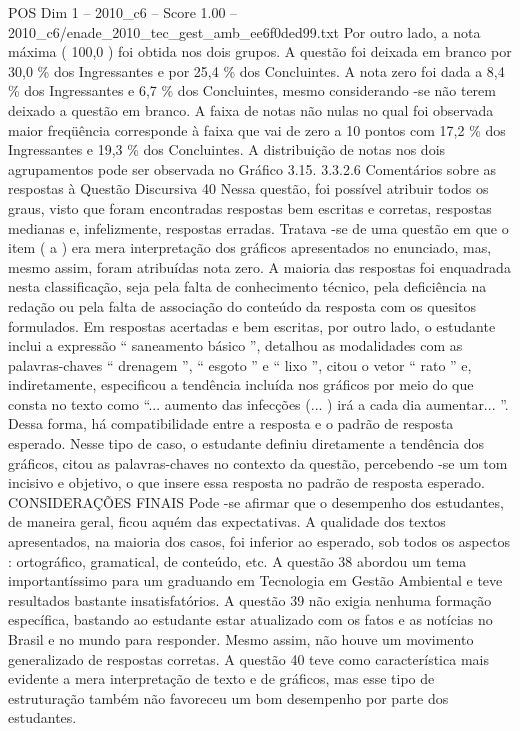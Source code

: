 \begin{textsample}{POS Dim 1 – 2010\_c6 – Score 1.00 – 2010\_c6/enade\_2010\_tec\_gest\_amb\_ee6f0ded99.txt}
Por outro lado, a nota máxima ( 100,0 ) foi obtida nos dois grupos.
A questão foi deixada em branco por 30,0 \% dos Ingressantes e por 25,4 \% dos Concluintes.
A nota zero foi dada a 8,4 \% dos Ingressantes e 6,7 \% dos Concluintes, mesmo considerando -se não terem deixado a questão em branco.
A faixa de notas não nulas no qual foi observada maior freqüência corresponde à faixa que vai de zero a 10 pontos com 17,2 \% dos Ingressantes e 19,3 \% dos Concluintes.
A distribuição de notas nos dois agrupamentos pode ser observada no Gráfico 3.15. 3.3.2.6 Comentários sobre as respostas à Questão Discursiva 40 Nessa questão, foi possível atribuir todos os graus, visto que foram encontradas respostas bem escritas e corretas, respostas medianas e, infelizmente, respostas erradas.
Tratava -se de uma questão em que o item ( a ) era mera interpretação dos gráficos apresentados no enunciado, mas, mesmo assim, foram atribuídas nota zero.
A maioria das respostas foi enquadrada nesta classificação, seja pela falta de conhecimento técnico, pela deficiência na redação ou pela falta de associação do conteúdo da resposta com os quesitos formulados.
Em respostas acertadas e bem escritas, por outro lado, o estudante inclui a expressão “ saneamento básico ”, detalhou as modalidades com as palavras-chaves “ drenagem ”, “ esgoto ” e “ lixo ”, citou o vetor “ rato ” e, indiretamente, especificou a tendência incluída nos gráficos por meio do que consta no texto como “... aumento das infecções (... ) irá a cada dia aumentar... ”.
Dessa forma, há compatibilidade entre a resposta e o padrão de resposta esperado.
Nesse tipo de caso, o estudante definiu diretamente a tendência dos gráficos, citou as palavras-chaves no contexto da questão, percebendo -se um tom incisivo e objetivo, o que insere essa resposta no padrão de resposta esperado.
CONSIDERAÇÕES FINAIS Pode -se afirmar que o desempenho dos estudantes, de maneira geral, ficou aquém das expectativas.
A qualidade dos textos apresentados, na maioria dos casos, foi inferior ao esperado, sob todos os aspectos : ortográfico, gramatical, de conteúdo, etc.
A questão 38 abordou um tema importantíssimo para um graduando em Tecnologia em Gestão Ambiental e teve resultados bastante insatisfatórios.
A questão 39 não exigia nenhuma formação específica, bastando ao estudante estar atualizado com os fatos e as notícias no Brasil e no mundo para responder.
Mesmo assim, não houve um movimento generalizado de respostas corretas.
A questão 40 teve como característica mais evidente a mera interpretação de texto e de gráficos, mas esse tipo de estruturação também não favoreceu um bom desempenho por parte dos estudantes.

\end{textsample}
